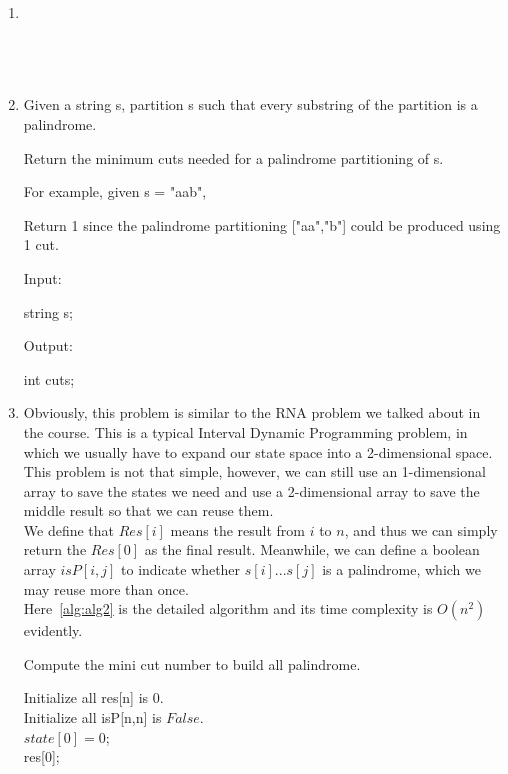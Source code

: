 \documentclass[12pt,a4paper]{article}
\makeatletter
\newtheorem*{solution}{Solution}
\renewenvironment{solution}[1][Solution] {\par\pushQED{\qed}\normalfont\topsep6\p@\@plus6\p@\relax\trivlist\item[\hskip\labelsep\bfseries#1\@addpunct{.}]\ignorespaces}{\popQED\endtrivlist\@endpefalse} \makeatother
\makeatother
\begin{document}
\begin{enumerate}
\begin{solution}
\end{solution}

\pagebreak

~\\
~\\
~\\
~\\

\item Given a string s, partition s such that every substring of the partition is a palindrome.

Return the minimum cuts needed for a palindrome partitioning of s.

For example, given s = "aab",

Return 1 since the palindrome partitioning ["aa","b"] could be produced using 1 cut.

Input:

string s;

Output:

int cuts;


\begin{solution}

Obviously, this problem is similar to the RNA problem we talked about in the course. This is a typical Interval Dynamic Programming problem, in which we usually have to expand our state space into a 2-dimensional space. This problem is not that simple, however, we can still use an 1-dimensional array to save the states we need and use a 2-dimensional array to save the middle result so that we can reuse them.\\

We define that $Res[i]$ means the result from $i$ to $n$, and thus we can simply return the $Res[0]$ as the final result. Meanwhile, we can define a boolean array $isP[i,j]$ to indicate whether $s[i]...s[j]$ is a palindrome, which we may reuse more than once.\\

Here~\ref{alg:alg2} is the detailed algorithm and its time complexity is $O(n^2)$ evidently.\\


\begin{algorithm} 
  \label{alg:alg2}
  \caption{Compute the mini cut number to build all palindrome.} 
  Initialize all res[n] is 0.\\
  Initialize all isP[n,n] is $False$.\\
  $state[0] = 0$;\\
  \Return res[0];
\end{algorithm}



\end{solution}
\end{enumerate}
\end{document}

